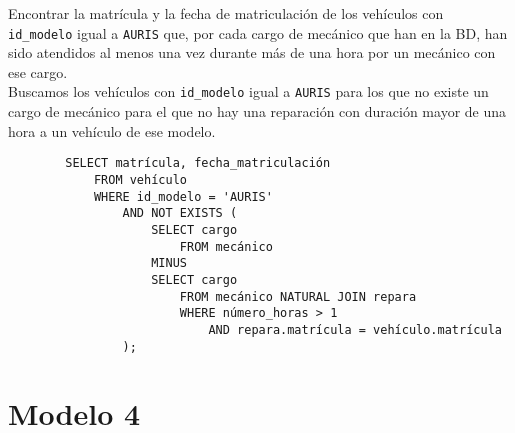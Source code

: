 \documentclass[12pt]{article}
\begin{document}
\begin{ejercicio}[SQL]
    Encontrar la matrícula y la fecha de matriculación de los vehículos con \verb|id_modelo| igual a \verb|AURIS| que, por cada cargo de mecánico que han en la BD, han sido atendidos al menos una vez durante más de una hora por un mecánico con ese cargo.\\

    Buscamos los vehículos con \verb|id_modelo| igual a \verb|AURIS| para los que no existe un cargo de mecánico para el que no hay una reparación con duración mayor de una hora a un vehículo de ese modelo.
    \begin{verbatim}
        SELECT matrícula, fecha_matriculación
            FROM vehículo
            WHERE id_modelo = 'AURIS'
                AND NOT EXISTS (
                    SELECT cargo
                        FROM mecánico
                    MINUS
                    SELECT cargo
                        FROM mecánico NATURAL JOIN repara
                        WHERE número_horas > 1
                            AND repara.matrícula = vehículo.matrícula
                );
    \end{verbatim}
\end{ejercicio}

\newpage
\section{Modelo 4}\label{sec:modelo4}
\end{document}
